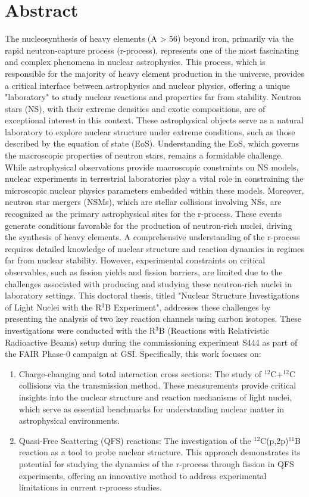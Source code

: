 \thispagestyle{empty}
\section*{Abstract}
The nucleosynthesis of heavy elements (A > 56) beyond iron, primarily via the rapid neutron-capture process (r-process), represents one of the most fascinating and complex phenomena in nuclear astrophysics. This process, which is responsible for the majority of heavy element production in the universe, provides a critical interface between astrophysics and nuclear physics, offering a unique "laboratory" to study nuclear reactions and properties far from stability. Neutron stars (NS), with their extreme densities and exotic compositions, are of exceptional interest in this context. These astrophysical objects serve as a natural laboratory to explore nuclear structure under extreme conditions, such as those described by the equation of state (EoS). Understanding the EoS, which governs the macroscopic properties of neutron stars, remains a formidable challenge. While astrophysical observations provide macroscopic constraints on NS models, nuclear experiments in terrestrial laboratories play a vital role in constraining the microscopic nuclear physics parameters embedded within these models.
Moreover, neutron star mergers (NSMs), which are stellar collisions involving NSs, are recognized as the primary astrophysical sites for the r-process. These events generate conditions favorable for the production of neutron-rich nuclei, driving the synthesis of heavy elements. A comprehensive understanding of the r-process requires detailed knowledge of nuclear structure and reaction dynamics in regimes far from nuclear stability. However, experimental constraints on critical observables, such as fission yields and fission barriers, are limited due to the challenges associated with producing and studying these neutron-rich nuclei in laboratory settings.
This doctoral thesis, titled "Nuclear Structure Investigations of Light Nuclei with the R$^3$B Experiment", addresses these challenges by presenting the analysis of two key reaction channels using carbon isotopes. These investigations were conducted with the R$^3$B (Reactions with Relativistic Radioactive Beams) setup during the commissioning experiment S444 as part of the FAIR Phase-0 campaign at GSI. Specifically, this work focuses on:
\begin{enumerate}
\item Charge-changing and total interaction cross sections: The study of $^{12}$C+$^{12}$C collisions via the transmission method. These measurements provide critical insights into the nuclear structure and reaction mechanisms of light nuclei, which serve as essential benchmarks for understanding nuclear matter in astrophysical environments.
\item Quasi-Free Scattering (QFS) reactions: The investigation of the $^{12}$C(p,2p)$^{11}$B reaction as a tool to probe nuclear structure. This approach demonstrates its potential for studying the dynamics of the r-process through fission in QFS experiments, offering an innovative method to address experimental limitations in current r-process studies.
\end{enumerate}
